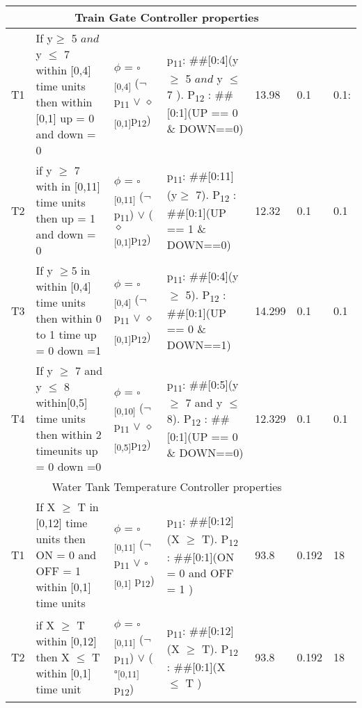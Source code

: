 {\begin{table}[]
{\begin{tabular}{ |p{0.3cm}|p{3.3cm}|p{3.3cm}|p{3 cm}|p{1.1cm}|p{0.5cm}|p{0.5cm}|}
		\hline
		\multicolumn{6}{|c|}{Train Gate Controller properties} \\
		\hline
		T1 & If y$\geq$ 5 $and$ y $\leq$ 7 within [0,4] time units then within [0,1]  up = 0 and down = 0 & $\phi$ = $\square$\textsubscript{[0,4]} ($\neg$ p\textsubscript{11} $\vee$ $\diamond$\textsubscript{[0,1]}p\textsubscript{12}) & p\textsubscript{11}: \#\#[0:4](y$\geq$ 5 $and$ y $\leq$ 7 ). P\textsubscript{12} : \#\#[0:1](UP == 0 \& DOWN==0)&13.98 & 0.1 & 0.1:\\
		T2 & if y $\geq$ 7 with in [0,11] time units then  up = 1 and down  = 0 & $\phi$ = $\square$\textsubscript{[0,11]} ($\neg$ p\textsubscript{11}) $\vee$ ($\diamond$\textsubscript{[0,1]}p\textsubscript{12}) & p\textsubscript{11}: \#\#[0:11](y$\geq$ 7). P\textsubscript{12} : \#\#[0:1](UP == 1 \& DOWN==0) & 12.32 & 0.1 & 0.1 \\
		T3 & If y $\geq$5 in within [0,4] time units then within 0 to 1 time up = 0 down =1 & $\phi$ = $\square$\textsubscript{[0,4]} ($\neg$ p\textsubscript{11} $\vee$ $\diamond$\textsubscript{[0,1]}p\textsubscript{12})& p\textsubscript{11}: \#\#[0:4](y$\geq$ 5). P\textsubscript{12} : \#\#[0:1](UP == 0 \& DOWN==1) & 14.299 & 0.1 & 0.1\\
		T4 & If y $\geq$ 7 and y $\leq$ 8 within[0,5] time units then within 2 timeunits up = 0 down =0 & $\phi$ = $\square$\textsubscript{[0,10]} ($\neg$ p\textsubscript{11} $\vee$ $\diamond$\textsubscript{[0,5]}p\textsubscript{12})& p\textsubscript{11}: \#\#[0:5](y $\geq$ 7 and y $\leq$ 8). P\textsubscript{12} : \#\#[0:1](UP == 0 \& DOWN==0) & 12.329 & 0.1 & 0.1\\		

		\hline
		\multicolumn{6}{|c|}{ Water Tank Temperature Controller properties} \\
		\hline
		T1 & If X $\geq$ T in [0,12] time units then ON = 0 and OFF = 1  within [0,1] time units & $\phi$ = $\square$\textsubscript{[0,11]} ($\neg$ p\textsubscript{11} $\vee$ $\square$\textsubscript{[0,1]} p\textsubscript{12}) &p\textsubscript{11}: \#\#[0:12](X $\geq$ T). P\textsubscript{12} : \#\#[0:1](ON = 0 and OFF = 1 )& 93.8  & 0.192& 18 \\
		T2 & if X $\geq$ T within [0,12] then X $\leq$ T within [0,1] time unit & $\phi$ = $\square$\textsubscript{[0,11]} ($\neg$ p\textsubscript{11}) $\vee$ ($\square$\textsubscript{[0,11]} p\textsubscript{12})& p\textsubscript{11}: \#\#[0:12](X $\geq$ T). P\textsubscript{12} : \#\#[0:1](X $\leq$ T )& 93.8 & 0.192 & 18\\
		

\end{tabular}}
\end{table}}
